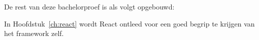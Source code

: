 
\section{}
\label{sec:opzetBachelorproef}

De rest van deze bachelorproef is als volgt opgebouwd:

In Hoofdstuk~\ref{ch:react} wordt React ontleed voor een goed begrip te krijgen van het framework zelf.



